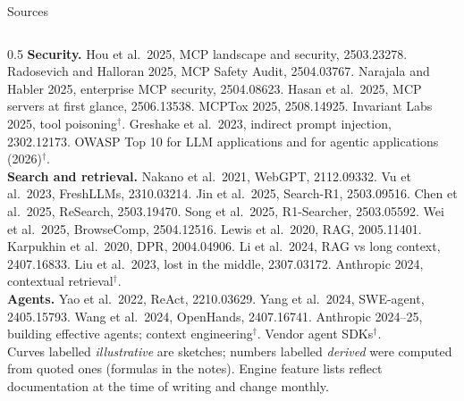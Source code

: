 \documentclass[aspectratio=169,11pt]{beamer}
\begin{document}
\begin{frame}{Sources}
\begin{columns}[T]
\begin{column}{0.5\textwidth}
\textbf{Security.} Hou et al.\ 2025, MCP landscape and security, 2503.23278. Radosevich and Halloran 2025, MCP Safety Audit, 2504.03767. Narajala and Habler 2025, enterprise MCP security, 2504.08623. Hasan et al.\ 2025, MCP servers at first glance, 2506.13538. MCPTox 2025, 2508.14925. Invariant Labs 2025, tool poisoning$^\dagger$. Greshake et al.\ 2023, indirect prompt injection, 2302.12173. OWASP Top 10 for LLM applications and for agentic applications (2026)$^\dagger$.\\[2pt]
\textbf{Search and retrieval.} Nakano et al.\ 2021, WebGPT, 2112.09332. Vu et al.\ 2023, FreshLLMs, 2310.03214. Jin et al.\ 2025, Search-R1, 2503.09516. Chen et al.\ 2025, ReSearch, 2503.19470. Song et al.\ 2025, R1-Searcher, 2503.05592. Wei et al.\ 2025, BrowseComp, 2504.12516. Lewis et al.\ 2020, RAG, 2005.11401. Karpukhin et al.\ 2020, DPR, 2004.04906. Li et al.\ 2024, RAG vs long context, 2407.16833. Liu et al.\ 2023, lost in the middle, 2307.03172. Anthropic 2024, contextual retrieval$^\dagger$.\\[2pt]
\textbf{Agents.} Yao et al.\ 2022, ReAct, 2210.03629. Yang et al.\ 2024, SWE-agent, 2405.15793. Wang et al.\ 2024, OpenHands, 2407.16741. Anthropic 2024--25, building effective agents; context engineering$^\dagger$. Vendor agent SDKs$^\dagger$.\\[4pt]
\textcolor{muted}{Curves labelled \emph{illustrative} are sketches; numbers labelled \emph{derived} were computed from quoted ones (formulas in the notes). Engine feature lists reflect documentation at the time of writing and change monthly.}
\end{column}
\end{columns}
\end{frame}
\end{document}
